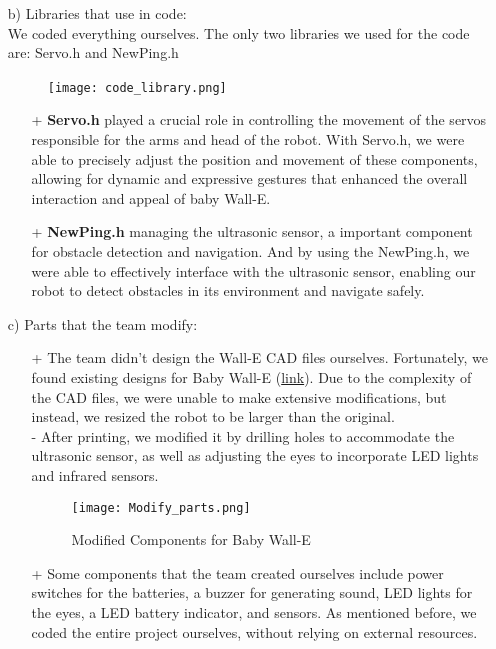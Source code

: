\documentclass[12pt]{article}
\begin{document}
\begin{itemize}
\begin{itemize}
        \item[b)] Libraries that use in code:\\
            We coded everything ourselves. The only two libraries we used for the code are: Servo.h and NewPing.h
            \begin{figure}[H]
                \centering
                \texttt{[image: code\_library.png]}\
                \label{fig:enter-label}
            \end{figure}
            \begin{itemize}
                \item[+] \textbf{Servo.h} played a crucial role in controlling the movement of the servos responsible for the arms and head of the robot. With Servo.h, we were able to precisely adjust the position and movement of these components, allowing for dynamic and expressive gestures that enhanced the overall interaction and appeal of baby Wall-E.
                \item[+] \textbf{NewPing.h} managing the ultrasonic sensor, a important component for obstacle detection and navigation. And by using the NewPing.h, we were able to effectively interface with the ultrasonic sensor, enabling our robot to detect obstacles in its environment and navigate safely.
            \end{itemize}
        
        \item[c)] Parts that the team modify:
        \begin{itemize}
            \item[+] The team didn't design the Wall-E CAD files ourselves. Fortunately, we found existing designs for Baby Wall-E (\href{https://www.thingiverse.com/thing:5957438}{link}). Due to the complexity of the CAD files, we were unable to make extensive modifications, but instead, we resized the robot to be larger than the original.
            \\ - After printing, we modified it by drilling holes to accommodate the ultrasonic sensor, as well as adjusting the eyes to incorporate LED lights and infrared sensors.
            \begin{figure}[H]
                \centering
                \texttt{[image: Modify\_parts.png]}
                \caption{Modified Components for Baby Wall-E}
                \label{fig:enter-label}
            \end{figure}
            \item[+] Some components that the team created ourselves include power switches for the batteries, a buzzer for generating sound, LED lights for the eyes, a LED battery indicator, and sensors. As mentioned before, we coded the entire project ourselves, without relying on external resources.
        \end{itemize}
        

\end{itemize}
\end{itemize}
\end{document}

